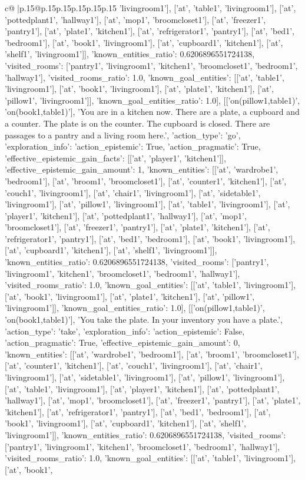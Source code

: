 \documentclass{article}
\begin{document}
{\begin{supertabular}{c@{$\;$}|p{.15\linewidth}@{}p{.15\linewidth}p{.15\linewidth}p{.15\linewidth}p{.15\linewidth}p{.15\linewidth}}
{{{'livingroom1'], ['at', 'table1', 'livingroom1'], ['at', 'pottedplant1', 'hallway1'], ['at', 'mop1', 'broomcloset1'], ['at', 'freezer1', 'pantry1'], ['at', 'plate1', 'kitchen1'], ['at', 'refrigerator1', 'pantry1'], ['at', 'bed1', 'bedroom1'], ['at', 'book1', 'livingroom1'], ['at', 'cupboard1', 'kitchen1'], ['at', 'shelf1', 'livingroom1']], 'known_entities_ratio': 0.6206896551724138, 'visited_rooms': ['pantry1', 'livingroom1', 'kitchen1', 'broomcloset1', 'bedroom1', 'hallway1'], 'visited_rooms_ratio': 1.0, 'known_goal_entities': [['at', 'table1', 'livingroom1'], ['at', 'book1', 'livingroom1'], ['at', 'plate1', 'kitchen1'], ['at', 'pillow1', 'livingroom1']], 'known_goal_entities_ratio': 1.0}}], [['on(pillow1,table1)', 'on(book1,table1)'], 'You are in a kitchen now. There are a plate, a cupboard and a counter. The plate is on the counter. The cupboard is closed. There are passages to a pantry and a living room here.', {'action_type': 'go', 'exploration_info': {'action_epistemic': True, 'action_pragmatic': True, 'effective_epistemic_gain_facts': [['at', 'player1', 'kitchen1']], 'effective_epistemic_gain_amount': 1, 'known_entities': [['at', 'wardrobe1', 'bedroom1'], ['at', 'broom1', 'broomcloset1'], ['at', 'counter1', 'kitchen1'], ['at', 'couch1', 'livingroom1'], ['at', 'chair1', 'livingroom1'], ['at', 'sidetable1', 'livingroom1'], ['at', 'pillow1', 'livingroom1'], ['at', 'table1', 'livingroom1'], ['at', 'player1', 'kitchen1'], ['at', 'pottedplant1', 'hallway1'], ['at', 'mop1', 'broomcloset1'], ['at', 'freezer1', 'pantry1'], ['at', 'plate1', 'kitchen1'], ['at', 'refrigerator1', 'pantry1'], ['at', 'bed1', 'bedroom1'], ['at', 'book1', 'livingroom1'], ['at', 'cupboard1', 'kitchen1'], ['at', 'shelf1', 'livingroom1']], 'known_entities_ratio': 0.6206896551724138, 'visited_rooms': ['pantry1', 'livingroom1', 'kitchen1', 'broomcloset1', 'bedroom1', 'hallway1'], 'visited_rooms_ratio': 1.0, 'known_goal_entities': [['at', 'table1', 'livingroom1'], ['at', 'book1', 'livingroom1'], ['at', 'plate1', 'kitchen1'], ['at', 'pillow1', 'livingroom1']], 'known_goal_entities_ratio': 1.0}}], [['on(pillow1,table1)', 'on(book1,table1)'], 'You take the plate. In your inventory you have a plate.', {'action_type': 'take', 'exploration_info': {'action_epistemic': False, 'action_pragmatic': True, 'effective_epistemic_gain_amount': 0, 'known_entities': [['at', 'wardrobe1', 'bedroom1'], ['at', 'broom1', 'broomcloset1'], ['at', 'counter1', 'kitchen1'], ['at', 'couch1', 'livingroom1'], ['at', 'chair1', 'livingroom1'], ['at', 'sidetable1', 'livingroom1'], ['at', 'pillow1', 'livingroom1'], ['at', 'table1', 'livingroom1'], ['at', 'player1', 'kitchen1'], ['at', 'pottedplant1', 'hallway1'], ['at', 'mop1', 'broomcloset1'], ['at', 'freezer1', 'pantry1'], ['at', 'plate1', 'kitchen1'], ['at', 'refrigerator1', 'pantry1'], ['at', 'bed1', 'bedroom1'], ['at', 'book1', 'livingroom1'], ['at', 'cupboard1', 'kitchen1'], ['at', 'shelf1', 'livingroom1']], 'known_entities_ratio': 0.6206896551724138, 'visited_rooms': ['pantry1', 'livingroom1', 'kitchen1', 'broomcloset1', 'bedroom1', 'hallway1'], 'visited_rooms_ratio': 1.0, 'known_goal_entities': [['at', 'table1', 'livingroom1'], ['at', 'book1', }}}
\end{supertabular}}
\end{document}
